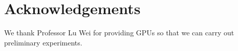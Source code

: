 \section*{Acknowledgements}
We thank Professor Lu Wei for providing GPUs so that we can carry out preliminary experiments.
